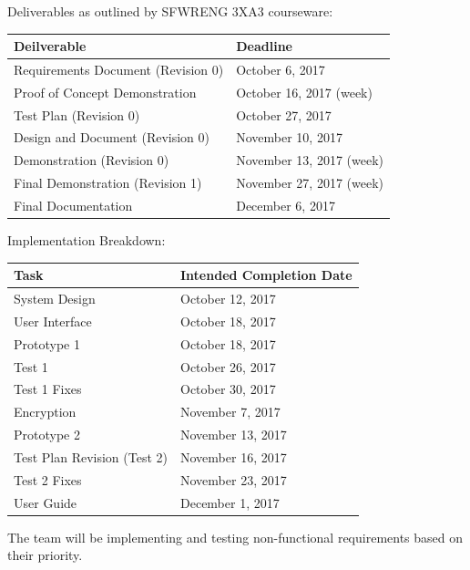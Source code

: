 \documentclass[12pt, titlepage]{article}
\begin{document}
Deliverables as outlined by SFWRENG 3XA3 courseware:

\begin{table}[H]
\centering
{}
\begin{tabular}{ | p{5cm} | p{9cm} | }
	\hline
	Deilverable & Deadline \\
	\hline
	Requirements Document (Revision 0) & October 6, 2017 \\
	\hline
	Proof of Concept Demonstration & October 16, 2017 (week) \\
	\hline
	Test Plan (Revision 0) & October 27, 2017 \\
	\hline
	Design and Document (Revision 0) & November 10, 2017 \\
	\hline
	Demonstration (Revision 0) & November 13, 2017 (week) \\
	\hline
	Final Demonstration (Revision 1) & November 27, 2017 (week) \\
	\hline
	Final Documentation & December 6, 2017 \\
\hline
\end{tabular}
\end{table}

Implementation Breakdown:

\begin{table}[H]
\centering
{}
\begin{tabular}{ | p{5cm} | p{10cm} | }
	\hline
	Task & Intended Completion Date \\
	\hline
	System Design & October 12, 2017 \\
	\hline
	User Interface & October 18, 2017 \\
	\hline
	Prototype 1 & October 18, 2017 \\
	\hline
	Test 1 & October 26, 2017 \\
	\hline
	Test 1 Fixes & October 30, 2017 \\
	\hline
	Encryption & November 7, 2017 \\
	\hline
	Prototype 2 & November 13, 2017 \\
	\hline
	Test Plan Revision (Test 2) & November 16, 2017 \\
	\hline
	Test 2 Fixes & November 23, 2017 \\
	\hline
	User Guide & December 1, 2017 \\
\hline
\end{tabular}
\end{table}

The team will be implementing and testing non-functional requirements based on their priority.
\end{document}
